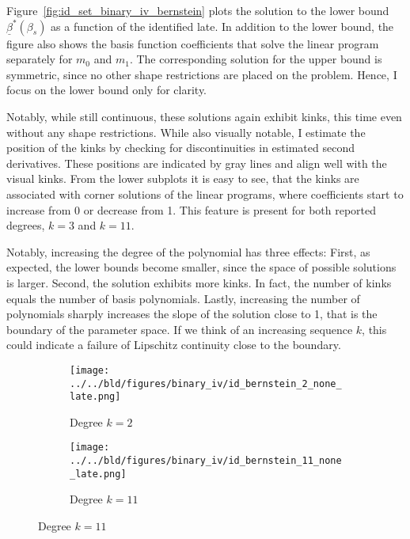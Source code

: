 \documentclass[12pt,a4paper,english]{article} %
\numberwithin{equation}{section}
\numberwithin{figure}{section}
\numberwithin{table}{section}
\begin{document}
Figure~\ref{fig:id_set_binary_iv_bernstein} plots the solution to the lower bound $\underline{\beta}^*(\beta_s)$ as a function of the identified late.
In addition to the lower bound, the figure also shows the basis function coefficients that solve the linear program separately for $m_0$ and $m_1$.
The corresponding solution for the upper bound is symmetric, since no other shape restrictions are placed on the problem. Hence, I focus on the lower bound only for clarity.

Notably, while still continuous, these solutions again exhibit kinks, this time even without any shape restrictions.
While also visually notable, I estimate the position of the kinks by checking for discontinuities in estimated second derivatives.
These positions are indicated by gray lines and align well with the visual kinks.
From the lower subplots it is easy to see, that the kinks are associated with corner solutions of the linear programs, where coefficients start to increase from 0 or decrease from 1.
This feature is present for both reported degrees, $k=3$ and $k=11$.

Notably, increasing the degree of the polynomial has three effects:
First, as expected, the lower bounds become smaller, since the space of possible solutions is larger.
Second, the solution exhibits more kinks. In fact, the number of kinks equals the number of basis polynomials.
Lastly, increasing the number of polynomials sharply increases the slope of the solution close to 1, that is the boundary of the parameter space.
If we think of an increasing sequence $k$, this could indicate a failure of Lipschitz continuity close to the boundary.

\begin{figure}

  \caption{Identified Sets for the Binary-IV Model with Bernstein Polynomial MTRs}\label{fig:id_set_binary_iv_bernstein}

  \centering
  \begin{subfigure}[b]{0.49\textwidth}
      \centering
      \texttt{[image: ../../bld/figures/binary\_iv/id\_bernstein\_2\_none\_late.png]}
      \caption{Degree $k=2$}\label{fig:id_set_binary_iv_bernstein_k_2}
  \end{subfigure}
  \hfill
  \begin{subfigure}[b]{0.49\textwidth}
      \centering
      \texttt{[image: ../../bld/figures/binary\_iv/id\_bernstein\_11\_none\_late.png]}
      \caption{Degree $k=11$}\label{fig:id_set_binary_iv_bernstein_k_11}
  \end{subfigure}
\end{figure}
\end{document}
